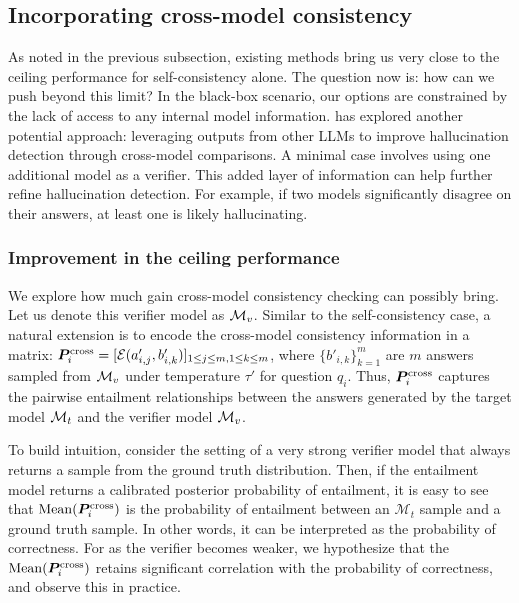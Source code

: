 \subsection{Incorporating cross-model consistency}

As noted in the previous subsection, existing methods bring us very close to the ceiling performance for self-consistency alone. The question now is: how can we push beyond this limit? In the black-box scenario, our options are constrained by the lack of access to any internal model information. \cite{SAC3_hallucination_detection_black_box_lms} has explored another potential approach: leveraging outputs from other LLMs to improve hallucination detection through cross-model comparisons. A minimal case involves using one additional model as a verifier. This added layer of information can help further refine hallucination detection. For example, if two models significantly disagree on their answers, at least one is likely hallucinating.  

\subsubsection{Improvement in the ceiling performance} \label{sec: improvement_ceiling_cross}
We explore how much gain cross-model consistency checking can possibly bring. Let us denote this verifier model as ${\mathcal{M}}_v$. Similar to the self-consistency case, a natural extension is to encode the cross-model consistency information in a matrix: ${\bm{P}}^{\text{cross}}_i = [ {\mathcal{E}}(a'_{i,j}, b'_{i,k}) ]_{1 \leq j \leq m, 1 \leq k \leq m }$, where $\{ b'_{i,k} \}_{k=1}^m$ are $m$ answers sampled from ${\mathcal{M}}_v$ under temperature $\tau'$ for question $q_i$. Thus, ${\bm{P}}^{\text{cross}}_i$ captures the pairwise entailment relationships between the answers generated by the target model ${\mathcal{M}}_t$ and the verifier model ${\mathcal{M}}_v$. 

\begin{remark}
To build intuition, consider the setting of a very strong verifier model that always returns a sample from the ground truth distribution. Then, if the entailment model returns a calibrated posterior probability of entailment, it is easy to see that $\mathrm{Mean}({\bm{P}}^{\text{cross}}_i)$ is the probability of entailment between an $\mathcal{M}_t$ sample and a ground truth sample. In other words, it can be interpreted as the probability of correctness. For as the verifier becomes weaker, we hypothesize that the $\mathrm{Mean}({\bm{P}}^{\text{cross}}_i)$ retains significant correlation with the probability of correctness, and observe this in practice.
\end{remark}

